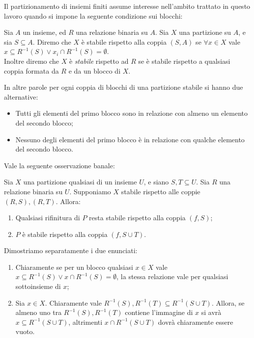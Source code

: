 Il partizionamento di insiemi finiti assume interesse nell'ambito trattato in questo lavoro quando si impone la seguente condizione sui blocchi:
\begin{definition}
    Sia $A$ un insieme, ed $R$ una relazione binaria su $A$. Sia $X$ una partizione su $A$, e sia $S \subseteq A$. Diremo che $X$ è stabile rispetto alla coppia $(S,A)$ se $\forall x \in X$ vale $x \subseteq R^{-1}(S) \lor x_i \cap R^{-1}(S) = \emptyset$.\\
    Inoltre diremo che $X$ è \emph{stabile} rispetto ad $R$ se è stabile rispetto a qualsiasi coppia formata da $R$ e da un blocco di $X$.
\end{definition}
In altre parole per ogni coppia di blocchi di una partizione stabile si hanno due alternative:
\begin{itemize}
    \item Tutti gli elementi del primo blocco sono in relazione con almeno un elemento del secondo blocco;
    \item Nessuno degli elementi del primo blocco è in relazione con qualche elemento del secondo blocco.
\end{itemize}
Vale la seguente osservazione banale:
\begin{observation}
    Sia $X$ una partizione qualsiasi di un insieme $U$, e siano $S,T \subseteq U$. Sia $R$ una relazione binaria su $U$. Supponiamo $X$ stabile rispetto alle coppie $(R,S),(R,T)$. Allora:
    \begin{enumerate}
        \item Qualsiasi rifinitura di $P$ resta stabile rispetto alla coppia $(f,S)$;
        \item $P$ è stabile rispetto alla coppia $(f,S \cup T)$.
    \end{enumerate}
\end{observation}
\begin{proof2}
    Dimostriamo separatamente i due enunciati:
    \begin{enumerate}
        \item Chiaramente se per un blocco qualsiasi $x \in X$ vale $x \subseteq R^{-1}(S) \lor x \cap R^{-1}(S) = \emptyset$, la stessa relazione vale per qualsiasi sottoinsieme di $x$;
        \item Sia $x \in X$. Chiaramente vale $R^{-1}(S),R^{-1}(T) \subseteq R^{-1}(S \cup T)$. Allora, se almeno uno tra $R^{-1}(S),R^{-1}(T)$ contiene l'immagine di $x$ si avrà $x \subseteq R^{-1}(S \cup T)$, altrimenti $x \cap R^{-1}(S \cup T)$ dovrà chiaramente essere vuoto.
    \end{enumerate}
\end{proof2}

